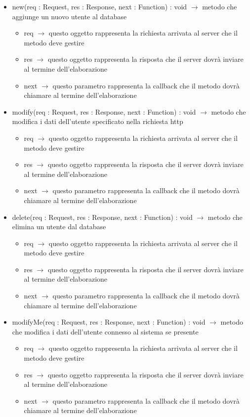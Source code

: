 \begin{description}
\begin{itemize}
	\item new(req : Request, res : Response, next : Function) : void $\rightarrow$ metodo che aggiunge un nuovo utente al database\begin{itemize}
		\item req $\rightarrow$ questo oggetto rappresenta la richiesta arrivata al server che il metodo deve gestire
		\item res $\rightarrow$ questo oggetto rappresenta la risposta che il server dovrà inviare al termine dell'elaborazione
		\item next $\rightarrow$ questo parametro rappresenta la callback che il metodo dovrà chiamare al termine dell'elaborazione
	\end{itemize}
	
	\item modify(req : Request, res : Response, next : Function) : void $\rightarrow$ metodo che modifica i dati dell'utente specificato nella richiesta http\begin{itemize}
		\item req $\rightarrow$ questo oggetto rappresenta la richiesta arrivata al server che il metodo deve gestire
		\item res $\rightarrow$ questo oggetto rappresenta la risposta che il server dovrà inviare al termine dell'elaborazione
		\item next $\rightarrow$ questo parametro rappresenta la callback che il metodo dovrà chiamare al termine dell'elaborazione
	\end{itemize}
	
	\item delete(req : Request, res : Response, next : Function) : void $\rightarrow$ metodo che elimina un utente dal database\begin{itemize}
		\item req $\rightarrow$ questo oggetto rappresenta la richiesta arrivata al server che il metodo deve gestire
		\item res $\rightarrow$ questo oggetto rappresenta la risposta che il server dovrà inviare al termine dell'elaborazione
		\item next $\rightarrow$ questo parametro rappresenta la callback che il metodo dovrà chiamare al termine dell'elaborazione
	\end{itemize}
	
	\item modifyMe(req : Request, res : Response, next : Function) : void $\rightarrow$ metodo che modifica i dati dell'utente connesso al sistema se presente\begin{itemize}
		\item req $\rightarrow$ questo oggetto rappresenta la richiesta arrivata al server che il metodo deve gestire
		\item res $\rightarrow$ questo oggetto rappresenta la risposta che il server dovrà inviare al termine dell'elaborazione
		\item next $\rightarrow$ questo parametro rappresenta la callback che il metodo dovrà chiamare al termine dell'elaborazione
	\end{itemize}
	

\end{itemize}
\end{description}
